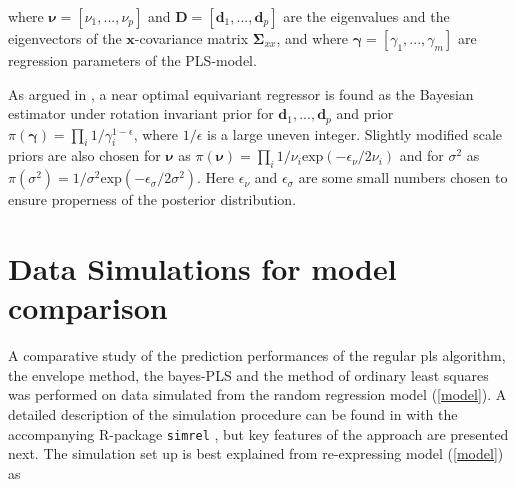 \documentclass[a4paper, 11pt]{article}
\begin{document}
where $\bm{\nu}=[\nu_1,...,\nu_p]$ and $\bm{D}=[\bm{d}_1,...,\bm{d}_p]$ are the eigenvalues and the eigenvectors of the $\bm{x}$-covariance matrix $\bm{\Sigma}_{xx}$, and where $\bm{\gamma}=[\gamma_1,...,\gamma_m]$ are regression parameters of the PLS-model.

As argued in \citet{helland2012near}, a near optimal equivariant regressor is
found as the Bayesian estimator under rotation invariant prior for
$\bm{d}_1,...,\bm{d}_p$ and prior $\pi(\bm{\gamma})=\prod_i
1/\gamma_i^{1-\epsilon}$, where $1/\epsilon$ is a large uneven integer. Slightly
modified scale priors are also chosen for $\bm{\nu}$ as $\pi(\bm{\nu}) =\prod_i
1/\nu_i \mathrm{exp}(-\epsilon_\nu/2\nu_i)$ and for $\sigma^2$ as$ \pi(\sigma^2)=1/\sigma^2\mathrm{exp}(-\epsilon_\sigma/2\sigma^2)$. Here $\epsilon_\nu$ and $\epsilon_\sigma$ are some small numbers chosen to ensure properness of the posterior distribution.





\section{Data Simulations for model comparison}
\label{sec:data-simulation}

A comparative study of the prediction performances of the regular pls algorithm, the envelope method, the bayes-PLS and the method of ordinary least squares was performed on data simulated from the random regression model (\ref{model}). A detailed description of the simulation procedure can be found in \citep{saebo2015simrel} with the accompanying R-package {\tt simrel} \citep{saebo2015simrel}, but key features of the approach are presented next. The simulation set up is best explained from re-expressing model (\ref{model}) as
\end{document}
